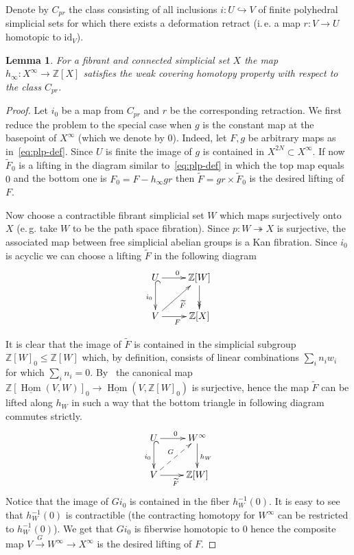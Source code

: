 \documentclass[oneside, 12pt]{amsart}
\theoremstyle{plain}
\numberwithin{equation}{section}
\newtheorem{lemma}{Lemma}
\numberwithin{lemma}{section}
\theoremstyle{remark}
\theoremstyle{definition}
\DeclareMathOperator{\Hom}{Hom}
\newcommand{\ZZ}{\mathbb{Z}}
\begin{document}
Denote by $C_{pr}$ the class consisting of all inclusions $i\colon U\hookrightarrow V$ of finite polyhedral simplicial sets 
 for which there exists a deformation retract (i.\,e. a map $r\colon V\to U$ homotopic to $\mathrm{id}_V$).
\begin{lemma} \label{lm:dhlp} For a fibrant and connected simplicial set $X$ the map $h_\infty \colon X^\infty \to \ZZ[X]$ satisfies the weak covering homotopy property with respect to the class $C_{pr}$.
\end{lemma}
\begin{proof}
 Let $i_0$ be a map from $C_{pr}$ and $r$ be the corresponding retraction.
 We first reduce the problem to the special case when $g$ is the constant map at the basepoint of $X^\infty$ (which we denote by $0$).
 Indeed, let $F, g$ be arbitrary maps as in~\eqref{eq:plp-def}.
 Since $U$ is finite the image of $g$ is contained in $X^{2N} \subset X^\infty$.
 If now $\widetilde{F}_0$ is a lifting in the diagram similar to~\eqref{eq:plp-def} in which the top map equals $0$ and the bottom one is $F_0 = F - h_\infty gr$
  then $\widetilde{F} = gr \times \widetilde{F}_0$ is the desired lifting of $F$.
  
 Now choose a contractible fibrant simplicial set $W$ which maps surjectively onto $X$ (e.\,g. take $W$ to be the path space fibration).
 Since $p \colon W \twoheadrightarrow X$ is surjective, the associated map between free simplicial abelian groups is a Kan fibration.
 Since $i_0$ is acyclic we can choose a lifting $\widetilde{F}$ in the following diagram
\begin{equation} \nonumber \xymatrix{ 
U \ar[r]^{0}  \ar@{^{(}->}_{i_0}[d] & \ZZ[W] \ar@{->>}[d]  \\
V \ar[r]_{F} \ar[ru]_{\widetilde{F}} & \ZZ[X]}
\end{equation}

 It is clear that the image of $\widetilde{F}$ is contained in the simplicial subgroup $\ZZ[W]_0 \leq \ZZ[W]$ which, by definition, consists of linear combinations $\sum_i n_i w_i$ for which $\sum_i n_i = 0$.
 By~\cite[Lemma~9.1]{Po17} the canonical map $\ZZ[\underline{\Hom}(V, W)]_0 \to \underline{\Hom}(V, \ZZ[W]_0)$ is surjective, hence
  the map $\widetilde{F}$ can be lifted along $h_W$ in such a way that the bottom triangle in following diagram commutes strictly.
\begin{equation} \nonumber \label{eq:W-lift} \xymatrix{ 
U \ar[r]^{0}  \ar@{^{(}->}_{i_0}[d]                               & W^\infty \ar[d]^{h_W}  \\
V \ar[r]_{\widetilde{F}} \ar@{-->}[ru]^{G} & \ZZ[W]}
\end{equation}
 Notice that the image of $Gi_0$ is contained in the fiber $h_W^{-1}(0)$.
 It is easy to see that $h_W^{-1}(0)$ is contractible (the contracting homotopy for $W^\infty$ can be restricted to $h_W^{-1}(0)$).
 We get that $Gi_0$ is fiberwise homotopic to $0$ hence the composite map $V \xrightarrow{G} W^\infty \to X^\infty$ is the desired lifting of $F$. \end{proof}
\end{document}
